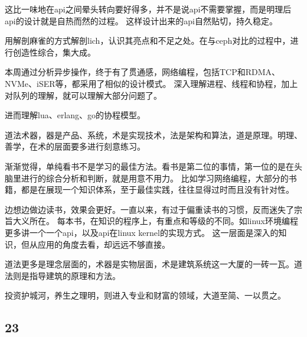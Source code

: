 这比一味地在api之间晕头转向要好得多，并不是说api不需要掌握，而是明理后api的设计就是自热而然的过程。
这样设计出来的api自然贴切，持久稳定。

用解剖麻雀的方式解剖lich，认识其亮点和不足之处。在与ceph对比的过程中，进行创造性综合，集大成。

本周通过分析异步操作，终于有了贯通感，网络编程，包括TCP和RDMA、NVMe、iSER等，都采用了相似的设计模式。
深入理解进程、线程和协程，加上对队列的理解，就可以理解大部分问题了。

进而理解lua、erlang、go的协程模型。

道法术器，器是产品、系统，术是实现技术，法是架构和算法，道是原理。明理、善学，在术的层面要多进行刻意练习。

渐渐觉得，单纯看书不是学习的最佳方法。看书是第二位的事情，第一位的是在头脑里进行的综合分析和判断，就是用意不用力。
比如学习网络编程，大部分的书籍，都是在展现一个知识体系，至于最佳实践，往往显得过时而且没有针对性。

边想边做边读书，效果会更好。一直以来，有过于偏重读书的习惯，反而迷失了宗旨大义所在。
每本书，在知识的程序上，有重点和等级的不同。如linux环境编程更多讲一个一个api，以及api在linux kernel的实现方式。
这一层面是深入的知识，但从应用的角度去看，却远远不够直接。

道法更多是理念层面的，术器是实物层面，术是建筑系统这一大厦的一砖一瓦。道法则是指导建筑的原理和方法。

投资护城河，养生之理明，则进入专业和财富的领域，大道至简、一以贯之。

\subsection{23}
